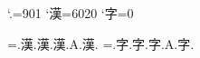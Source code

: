 \prebreakpenalty`.=901
\postbreakpenalty`漢=6020
\postbreakpenalty`字=0

=\hbox{.漢\relax.漢\null.漢.A{}.漢{}.\showlists}
=\hbox{.字\relax.字\null.字.A{}.字{}.\showlists}

\bye